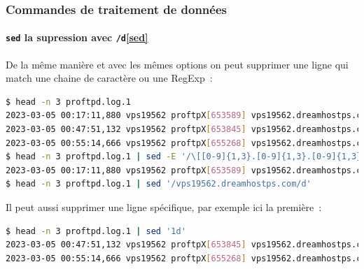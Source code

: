 \documentclass{beamer}
\begin{document}
    \begin{frame}[fragile]
        \transdissolve
        \frametitle{Commandes de traitement de données}
        \framesubtitle{\lstinline{sed} la supression avec \lstinline{/d}\cref{sed}}
        De la même manière et avec les mêmes options on peut supprimer une ligne qui match une chaine de caractère ou une RegExp~:
        \begin{lstlisting}[language=bash,basicstyle=\tiny\ttfamily]
$ head -n 3 proftpd.log.1
2023-03-05 00:17:11,880 vps19562 proftpX[653589] vps19562.dreamhostps.com: ProFTPD 1.3.6c (maint) (built Thu Feb 27 2020 19:34:56 UTC) standalone mode STARTUP
2023-03-05 00:47:51,132 vps19562 proftpX[653845] vps19562.dreamhostps.com (aurora.probe.onyphe.net[142.4.218.114]): USER anonymous: no such user found from aurora.probe.onyphe.net [142.4.218.114] to ::ffff:66.33.201.239:21
2023-03-05 00:55:14,666 vps19562 proftpX[655268] vps19562.dreamhostps.com (hodson.probe.onyphe.net[178.32.197.87]): USER anonymous: no such user found from hodson.probe.onyphe.net [178.32.197.87] to ::ffff:66.33.201.239:21
$ head -n 3 proftpd.log.1 | sed -E '/\[[0-9]{1,3}.[0-9]{1,3}.[0-9]{1,3}.[0-9]{1,3}\]/d'
2023-03-05 00:17:11,880 vps19562 proftpX[653589] vps19562.dreamhostps.com: ProFTPD 1.3.6c (maint) (built Thu Feb 27 2020 19:34:56 UTC) standalone mode STARTUP
$ head -n 3 proftpd.log.1 | sed '/vps19562.dreamhostps.com/d'
        \end{lstlisting}
        Il peut aussi supprimer une ligne spécifique, par exemple ici la première~:
        \begin{lstlisting}[language=bash,basicstyle=\tiny\ttfamily]
$ head -n 3 proftpd.log.1 | sed '1d'
2023-03-05 00:47:51,132 vps19562 proftpX[653845] vps19562.dreamhostps.com (aurora.probe.onyphe.net[142.4.218.114]): USER anonymous: no such user found from aurora.probe.onyphe.net [142.4.218.114] to ::ffff:66.33.201.239:21
2023-03-05 00:55:14,666 vps19562 proftpX[655268] vps19562.dreamhostps.com (hodson.probe.onyphe.net[178.32.197.87]): USER anonymous: no such user found from hodson.probe.onyphe.net [178.32.197.87] to ::ffff:66.33.201.239:21
        \end{lstlisting}
    \end{frame}
\end{document}
